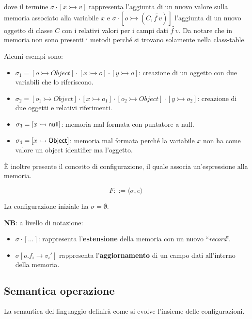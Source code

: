 \noindent dove il termine $ \sigma \cdot [x \rightarrowtail v]$ rappresenta l'aggiunta di un nuovo valore sulla memoria associato alla variabile $x$ e $\sigma \cdot [o \rightarrowtail (C, \tilde{f \ v})]$ l'aggiunta di un nuovo oggetto di classe $C$ con i relativi valori per i campi dati $\tilde{f \ v}$. Da notare che in memoria non sono presenti i metodi perché si trovano solamente nella class-table.

Alcuni esempi sono:

\begin{itemize}
	\item $\sigma_1 = [o \rightarrowtail Object]\cdot[x \rightarrowtail o] \cdot [y \rightarrowtail o] $: creazione di un oggetto con due variabili che lo riferiscono.
	\item $ \sigma_2 = [o_1 \rightarrowtail Object] \cdot [x \rightarrowtail o_1] \cdot  [o_2 \rightarrowtail Object]\cdot [y \rightarrowtail o_2]$: creazione di due oggetti e relativi riferimenti.
	\item $\sigma_3 = [x \rightarrowtail \Null]$: memoria mal formata con puntatore a null.
	\item $\sigma_4 = [x \rat \text{Object}]$: memoria mal formata perché la variabile $x$ non ha come valore un object identifier ma l'oggetto.
\end{itemize}

\noindent \`E inoltre presente il concetto di configurazione, il quale associa un'espressione alla memoria.

$$
F ::= \langle \sigma, e\rangle 
$$

\noindent La configurazione iniziale ha $\sigma = \emptyset$.

\textbf{NB}: a livello di notazione:
\begin{itemize}
	\item $	\sigma \cdot [\ldots]$: rappresenta l'\textbf{estensione} della memoria con un nuovo ``\textit{record}''.
	\item $ \sigma[o.f_i \to v_i']$ rappresenta l'\textbf{aggiornamento} di un campo dati all'interno della memoria.
	
\end{itemize}

\subsection{Semantica operazione}

La semantica del linguaggio definirà come si evolve l'insieme delle configurazioni.

